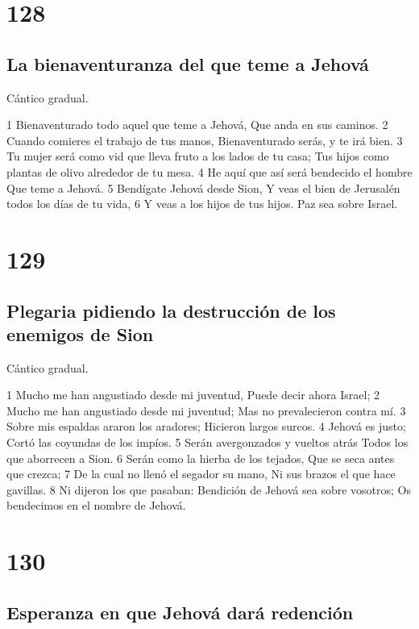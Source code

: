 \chapter{128}

\section*{La bienaventuranza del que teme a Jehová}

Cántico gradual.

1 Bienaventurado todo aquel que teme a Jehová,
Que anda en sus caminos.
2 Cuando comieres el trabajo de tus manos,
Bienaventurado serás, y te irá bien.
3 Tu mujer será como vid que lleva fruto a los lados de tu casa;
Tus hijos como plantas de olivo alrededor de tu mesa.
4 He aquí que así será bendecido el hombre
Que teme a Jehová.
5 Bendígate Jehová desde Sion,
Y veas el bien de Jerusalén todos los días de tu vida,
6 Y veas a los hijos de tus hijos.
Paz sea sobre Israel.

\chapter{129}

\section*{Plegaria pidiendo la destrucción de los enemigos de Sion}

Cántico gradual.

1 Mucho me han angustiado desde mi juventud,
Puede decir ahora Israel;
2 Mucho me han angustiado desde mi juventud;
Mas no prevalecieron contra mí.
3 Sobre mis espaldas araron los aradores;
Hicieron largos surcos.
4 Jehová es justo;
Cortó las coyundas de los impíos.
5 Serán avergonzados y vueltos atrás
Todos los que aborrecen a Sion.
6 Serán como la hierba de los tejados,
Que se seca antes que crezca;
7 De la cual no llenó el segador su mano,
Ni sus brazos el que hace gavillas.
8 Ni dijeron los que pasaban:
Bendición de Jehová sea sobre vosotros;
Os bendecimos en el nombre de Jehová.

\chapter{130}

\section*{Esperanza en que Jehová dará redención}

